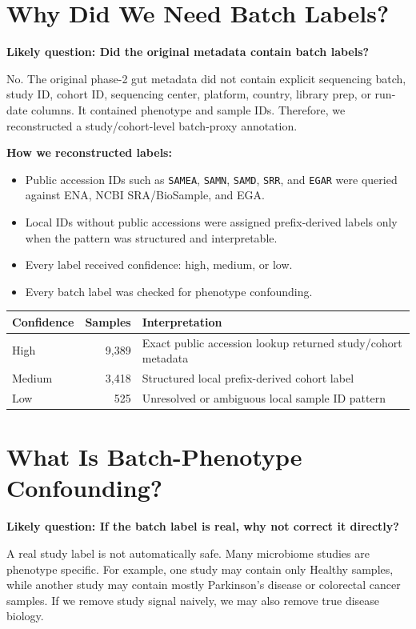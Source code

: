 \documentclass[11pt]{article}
\newcommand{\code}[1]{\texttt{\small #1}}
\begin{document}
\section{Why Did We Need Batch Labels?}

\textbf{Likely question: Did the original metadata contain batch labels?}

No. The original phase-2 gut metadata did not contain explicit sequencing batch, study ID,
cohort ID, sequencing center, platform, country, library prep, or run-date columns. It
contained phenotype and sample IDs. Therefore, we reconstructed a study/cohort-level
batch-proxy annotation.

\textbf{How we reconstructed labels:}

\begin{itemize}
  \item Public accession IDs such as \code{SAMEA}, \code{SAMN}, \code{SAMD},
  \code{SRR}, and \code{EGAR} were queried against ENA, NCBI SRA/BioSample, and EGA.
  \item Local IDs without public accessions were assigned prefix-derived labels only when
  the pattern was structured and interpretable.
  \item Every label received confidence: high, medium, or low.
  \item Every batch label was checked for phenotype confounding.
\end{itemize}

\begin{center}
\begin{tabular}{lrl}
\toprule
Confidence & Samples & Interpretation \\
\midrule
High & 9,389 & Exact public accession lookup returned study/cohort metadata \\
Medium & 3,418 & Structured local prefix-derived cohort label \\
Low & 525 & Unresolved or ambiguous local sample ID pattern \\
\bottomrule
\end{tabular}
\end{center}

\section{What Is Batch-Phenotype Confounding?}

\textbf{Likely question: If the batch label is real, why not correct it directly?}

A real study label is not automatically safe. Many microbiome studies are phenotype
specific. For example, one study may contain only Healthy samples, while another study may
contain mostly Parkinson's disease or colorectal cancer samples. If we remove study signal
naively, we may also remove true disease biology.
\end{document}
